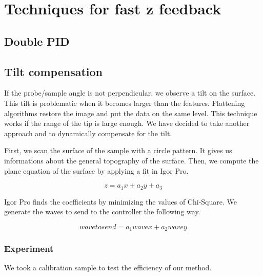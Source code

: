 \chapter{Techniques for fast z feedback}

\section{Double PID}

\section{Tilt compensation}

If the probe/sample angle is not perpendicular, we observe a tilt on the surface. This tilt is problematic when it becomes larger than the features. Flattening algorithms restore the image and put the data on the same level. This technique works if the range of the tip is large enough. We have decided to take another approach and to dynamically compensate for the tilt.

First, we scan the surface of the sample with a circle pattern. It gives us informations about the general topography of the surface. Then, we compute the plane equation of the surface by applying a fit in Igor Pro.

\begin{equation}\label{eqn:planeeq}
z = a_1 x + a_2 y + a_3 
\end{equation}

Igor Pro finds the coefficients by minimizing the values of Chi-Square. We generate the waves to send to the controller the following way.

\begin{equation}\label{eqn:sendwave}
wavetosend = a_1 wavex + a_2 wavey 
\end{equation}

\subsection{Experiment}

We took a calibration sample to test the efficiency of our method.


